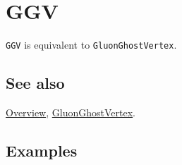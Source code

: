 \documentclass[../FeynCalcManual.tex]{subfiles}
\begin{document}
\hypertarget{ggv}{
\section{GGV}\label{ggv}}

\texttt{GGV} is equivalent to \texttt{GluonGhostVertex}.

\subsection{See also}

\hyperlink{toc}{Overview},
\hyperlink{gluonghostvertex}{GluonGhostVertex}.

\subsection{Examples}
\end{document}
